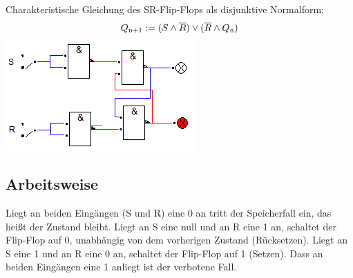 \documentclass[a4paper, 11pt, fleqn, DIV=10, twoside, BCOR=10mm]{scrreprt}
\begin{document}
\begin{center}
\vspace{20mm}
Charakteristische Gleichung des SR-Flip-Flops als disjunktive Normalform:
\begin{equation}
	Q\textsubscript{n+1}:=( S\wedge \overline{R})\vee (\overline{R} \wedge Q \textsubscript{n})
\end{equation}
\includegraphics[width=0.4\columnwidth]{DT3Graphics/SR-FF-NAND.PNG}
\subsection*{Arbeitsweise}
Liegt an beiden Eingängen (S und R) eine 0 an tritt der Speicherfall ein, das heißt der Zustand bleibt. Liegt an S eine null und an R eine 1 an, schaltet der Flip-Flop auf 0, unabhängig von dem vorherigen Zustand (Rücksetzen). Liegt an S eine 1 und an R eine 0 an, schaltet der Flip-Flop auf 1 (Setzen). Dass an beiden Eingängen eine 1 anliegt ist der verbotene Fall. 


\end{center}
\end{document}
